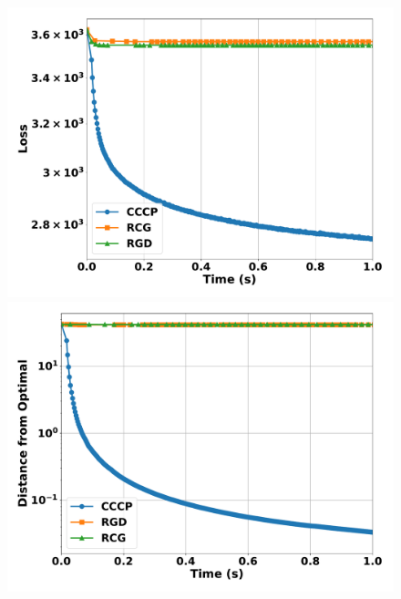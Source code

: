 \documentclass[sn-nature]{sn-jnl}%
\theoremstyle{thmstyleone}%
\theoremstyle{thmstyletwo}%
\theoremstyle{thmstylethree}%
\begin{document}

\begin{figure}[htbp]
  \centering
  \begin{minipage}[b]{0.45\textwidth}
    \centering
    \includegraphics[width=\textwidth]{figuresV2/square_root/loss_time_200_ill.pdf}
  \end{minipage}
  \hfill
  \begin{minipage}[b]{0.45\textwidth}
    \centering
    \includegraphics[width=\textwidth]{figuresV2/square_root/distance_time_200_ill.pdf}

\end{minipage}
\end{figure}
\end{document}
